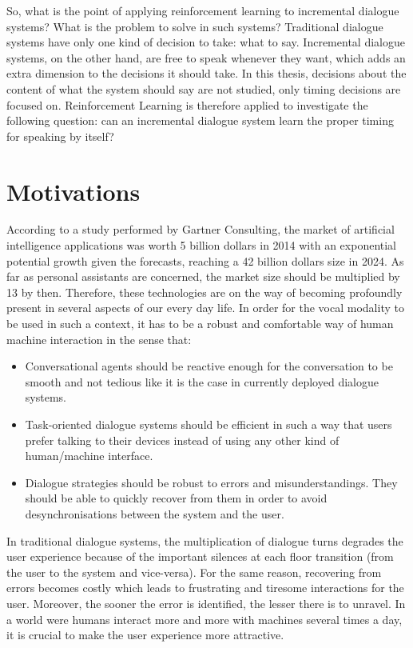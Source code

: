         So, what is the point of applying reinforcement learning to incremental dialogue systems? What is the problem to solve in such systems? Traditional dialogue systems have only one kind of decision to take: what to say. Incremental dialogue systems, on the other hand, are free to speak whenever they want, which adds an extra dimension to the decisions it should take. In this thesis, decisions about the content of what the system should say are not studied, only timing decisions are focused on. Reinforcement Learning is therefore applied to investigate the following question: can an incremental dialogue system learn the proper timing for speaking by itself?
				
\section*{Motivations}

				According to a study performed by Gartner Consulting, the market of artificial intelligence applications was worth 5 billion dollars in 2014 with an exponential potential growth given the forecasts, reaching a 42 billion dollars size in 2024. As far as personal assistants are concerned, the market size should be multiplied by 13 by then. Therefore, these technologies are on the way of becoming profoundly present in several aspects of our every day life. In order for the vocal modality to be used in such a context, it has to be a robust and comfortable way of human machine interaction in the sense that:
				
				\begin{itemize}
					\item Conversational agents should be reactive enough for the conversation to be smooth and not tedious like it is the case in currently deployed dialogue systems.
					\item Task-oriented dialogue systems should be efficient in such a way that users prefer talking to their devices instead of using any other kind of human/machine interface.
					\item Dialogue strategies should be robust to errors and misunderstandings. They should be able to quickly recover from them in order to avoid desynchronisations between the system and the user.
				\end{itemize}
				
				In traditional dialogue systems, the multiplication of dialogue turns degrades the user experience because of the important silences at each floor transition (from the user to the system and vice-versa). For the same reason, recovering from errors becomes costly which leads to frustrating and tiresome interactions for the user. Moreover, the sooner the error is identified, the lesser there is to unravel. In a world were humans interact more and more with machines several times a day, it is crucial to make the user experience more attractive.
				
